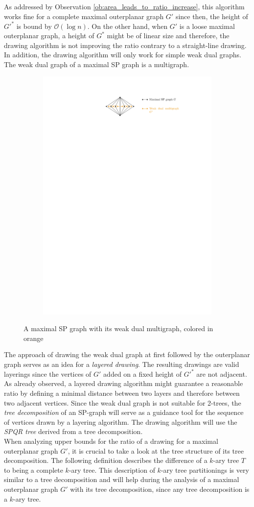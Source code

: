 As addressed by Observation \ref{ob:area_leads_to_ratio_increase}, this algorithm works fine for a complete maximal outerplanar graph $G'$ since then, the height of $G'^*$ is bound by $\mathcal{O}(\log n)$. On the other hand, when $G'$ is a loose maximal outerplanar graph, a height of $G^*$ might be of linear size and therefore, the drawing algorithm is not improving the ratio contrary to a straight-line drawing. In addition, the drawing algorithm will only work for simple weak dual graphs. The weak dual graph of a maximal SP graph is a multigraph.
	\begin{figure}[H]
	\centering
	\begin{subfigure}{\textwidth}
		\centering
		\includegraphics[page=1,width=0.6\linewidth]{graphics/maximal_sp_weak_dual.pdf}
	\end{subfigure}
	\caption{A maximal SP graph with its weak dual multigraph, colored in orange}
\end{figure}
The approach of drawing the weak dual graph at first followed by the outerplanar graph serves as an idea for a \emph{layered drawing}. The resulting drawings are valid layerings since the vertices of $G'$ added on a fixed height of $G'^*$ are not adjacent. As already observed, a layered drawing algorithm might guarantee a reasonable ratio by defining a minimal distance between two layers and therefore between two adjacent vertices. Since the weak dual graph is not suitable for 2-trees, the \emph{tree decomposition} of an SP-graph will serve as a guidance tool for the sequence of vertices drawn by a layering algorithm. The drawing algorithm will use the \emph{SPQR tree} derived from a tree decomposition.\\
When analyzing upper bounds for the ratio of a drawing for a maximal outerplanar graph $G'$, it is crucial to take a look at the tree structure of its tree decomposition. The following definition describes the difference of a $k$-ary tree $T$ to being a complete $k$-ary tree. This description of $k$-ary tree partitionings is very similar to a tree decomposition and will help during the analysis of a maximal outerplanar graph $G'$ with its tree decomposition, since any tree decomposition is a $k$-ary tree.
